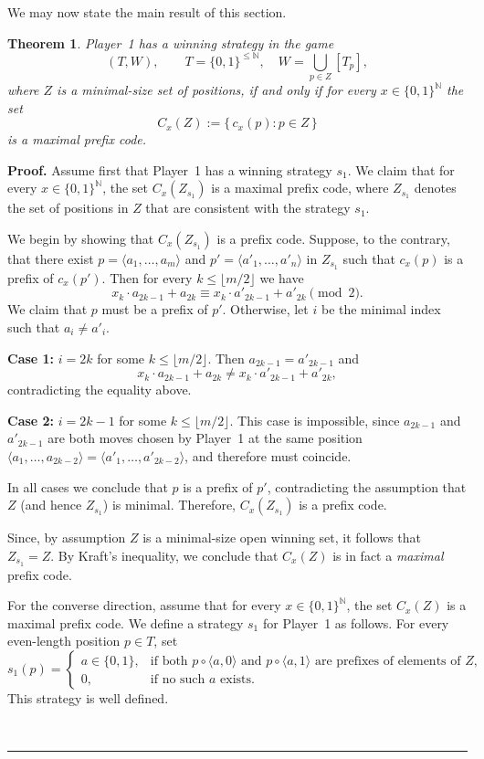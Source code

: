 \documentclass[a4,12pt]{article}%
\newtheorem{theorem}{Theorem}[section]
\newenvironment{proof}[1][Proof]{\textbf{#1.} }{\ \rule{0.5em}{0.5em}}
\begin{document}
\medskip
We may now state the main result of this section.
\begin{theorem}
\label{thm:binary-tree-prefix}
Player~1 has a winning strategy in the game
\[
(T,W), \qquad T=\{0,1\}^{\leq\mathbb{N}}, \quad W=\bigcup_{p\in Z}[T_p],
\]
where $Z$ is a minimal-size set of positions, if and only if for every
$x\in\{0,1\}^{\mathbb{N}}$ the set
\[
C_x(Z):=\{\, c_x(p) : p\in Z \,\}
\]
is a maximal prefix code.
\end{theorem}
\begin{proof}
Assume first that Player~1 has a winning strategy $s_1$.  
We claim that for every $x \in \{0,1\}^{\mathbb{N}}$, the set
$C_x(Z_{s_1})$ is a maximal prefix code, where $Z_{s_1}$ denotes the set
of positions in $Z$ that are consistent with the strategy $s_1$.

We begin by showing that $C_x(Z_{s_1})$ is a prefix code.
Suppose, to the contrary, that there exist
$p=\langle a_1,\dots,a_m\rangle$ and
$p'=\langle a'_1,\dots,a'_n\rangle$ in $Z_{s_1}$ such that
$c_x(p)$ is a prefix of $c_x(p')$. Then for every
$k \leq \lfloor m/2 \rfloor$ we have
\[
x_k \cdot a_{2k-1} + a_{2k}
\equiv
x_k \cdot a'_{2k-1} + a'_{2k}
\pmod{2}.
\]
We claim that $p$ must be a prefix of $p'$. Otherwise, let $i$ be the
minimal index such that $a_i \neq a'_i$.

\medskip
\noindent
\textbf{Case 1:} $i=2k$ for some $k \leq \lfloor m/2 \rfloor$.  
Then $a_{2k-1}=a'_{2k-1}$ and
\[
x_k \cdot a_{2k-1} + a_{2k}
\neq
x_k \cdot a'_{2k-1} + a'_{2k},
\]
contradicting the equality above.

\medskip
\noindent
\textbf{Case 2:} $i=2k-1$ for some $k \leq \lfloor m/2 \rfloor$.  
This case is impossible, since $a_{2k-1}$ and $a'_{2k-1}$ are both moves
chosen by Player~1 at the same position
$\langle a_1,\dots,a_{2k-2}\rangle=\langle a'_1,\dots,a'_{2k-2}\rangle$,
and therefore must coincide.

\medskip
In all cases we conclude that $p$ is a prefix of $p'$, contradicting the
assumption that $Z$ (and hence $Z_{s_1}$) is minimal. Therefore,
$C_x(Z_{s_1})$ is a prefix code.

Since, by assumption $Z$ is a minimal-size open winning set, it follows that $Z_{s_1}=Z$.
By Kraft’s inequality, we conclude that $C_x(Z)$ is in fact a
\emph{maximal} prefix code.

\medskip
\noindent
For the converse direction, assume that for every
$x \in \{0,1\}^{\mathbb{N}}$, the set $C_x(Z)$ is a maximal prefix code.
We define a strategy $s_1$ for Player~1 as follows. For every even-length
position $p \in T$, set
\[
s_1(p) =
\begin{cases}
a \in \{0,1\}, & \text{if both } p \circ \langle a,0\rangle
\text{ and } p \circ \langle a,1\rangle \text{ are prefixes of elements of } Z,\\
0, & \text{if no such } a \text{ exists}.
\end{cases}
\]
This strategy is well defined.


\end{proof}
\end{document}
